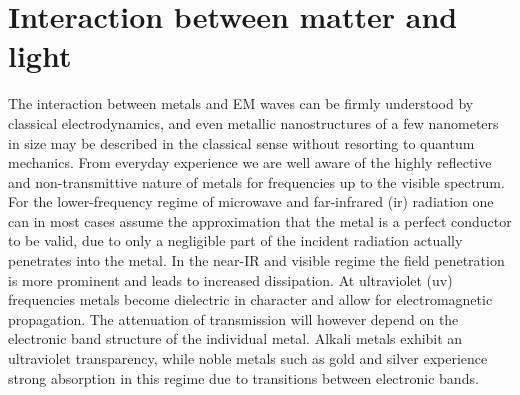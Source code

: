 \section{Interaction between matter and light}
The interaction between metals and EM waves can be firmly understood by classical electrodynamics, and even metallic nanostructures of a few nanometers in size may be described in the classical sense without resorting to quantum mechanics\cite{maier}. From everyday experience we are well aware of the highly reflective and non-transmittive nature of metals for frequencies up to the visible spectrum. For the lower-frequency regime of microwave and far-infrared (\ac{ir}) radiation
one can in most cases assume the approximation that the metal is a perfect conductor to be valid, due to only a negligible part of the incident radiation actually penetrates into the metal. In the near-IR and visible regime the field penetration is more prominent and leads to increased dissipation. At ultraviolet (\ac{uv}) frequencies metals become dielectric in character and allow for electromagnetic propagation. The attenuation of transmission will however depend on the electronic band structure of the individual metal. Alkali metals exhibit an ultraviolet transparency, while noble metals such as gold and silver experience strong absorption in this regime due to transitions between electronic bands.

